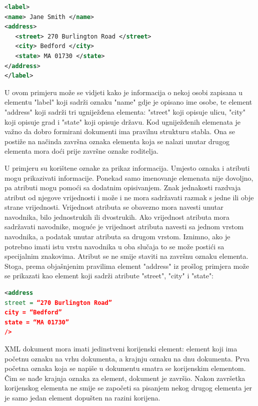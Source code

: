 \documentclass{foi}
\begin{document}
\begin{lstlisting}[language=XML]
<label>
<name> Jane Smith </name>
<address>
   <street> 270 Burlington Road </street>
   <city> Bedford </city>
   <state> MA 01730 </state>
</address>
</label>
\end{lstlisting}

U ovom primjeru može se vidjeti kako je informacija o nekoj osobi zapisana u elementu  "label" koji sadrži oznaku "name" gdje je opisano ime osobe, te element "address" koji sadrži tri ugniježđena elementa: "street" koji opisuje ulicu, "city" koji opisuje grad i "state" koji opisuje državu. Kod ugniježđenih elemenata je važno da dobro formirani dokumenti ima pravilnu strukturu stabla. Ona se postiže na načinda završna oznaka elementa koja se nalazi unutar drugog elementa mora doći prije završne oznake roditelja.

U primjeru su korištene oznake za prikaz informacija. Umjesto oznaka i atributi mogu prikazivati informacije. Ponekad samo imenovanje elemenata nije dovoljno, pa atributi mogu pomoći sa dodatnim opisivanjem. Znak jednakosti razdvaja atribut od njegove vrijednosti i može i ne mora sadržavati razmak s jedne ili obje strane vrijednosti. Vrijednost atributa se obavezno mora navesti unutar navodnika, bilo jednostrukih ili dvostrukih. Ako vrijednost atributa mora sadržavati navodnike, moguće je vrijednost atributa navesti sa jednom vrstom navodnika, a podatak unutar atributa sa drugom vrstom. Iznimno, ako je potrebno imati istu vrstu navodnika u oba slučaja to se može postići sa specijalnim znakovima. Atribut se ne smije staviti na završnu oznaku elementa. Stoga, prema objašnjenim pravilima element "address" iz prošlog primjera može se prikazati kao element koji sadrži atribute "street", "city" i "state": \cite{xmlDatabase}

\begin{lstlisting}[language=XML]
<address
street = “270 Burlington Road”
city = “Bedford”
state = “MA 01730”
/>
\end{lstlisting}

XML dokument mora imati jedinstveni korijenski element: element koji ima početnu oznaku na vrhu dokumenta, a krajnju oznaku na dnu dokumenta. Prva početna oznaka koja se napiše u dokumentu smatra se korijenskim elementom. Čim se nađe krajnja oznaka za element, dokument je završio. Nakon završetka korijenskog elementa ne smije se započeti sa pisanjem nekog drugog elementa jer je samo jedan element dopušten na razini korijena.
\end{document}
